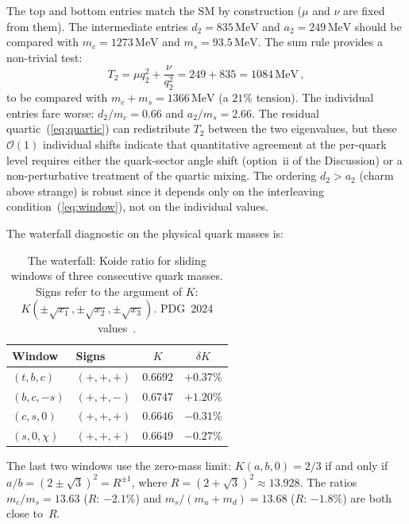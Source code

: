 \documentclass[preprint,12pt]{elsarticle}
\newcommand{\MeV}{\,\mathrm{MeV}}
\begin{document}
The top and bottom entries match the SM by construction
($\mu$ and $\nu$ are fixed from them).
The intermediate entries $d_2 = 835\MeV$ and $a_2 = 249\MeV$
should be compared with $m_c = 1273\MeV$ and $m_s = 93.5\MeV$.
The sum rule provides a non-trivial test:
\begin{equation}
  T_2 = \mu q_2^2 + \frac{\nu}{q_2^2}
  = 249 + 835 = 1084\MeV\,,
  \label{eq:sum_rule}
\end{equation}
to be compared with $m_c + m_s = 1366\MeV$ (a $21\%$ tension).
The individual entries fare worse:
$d_2/m_c = 0.66$ and $a_2/m_s = 2.66$.
The residual quartic~(\ref{eq:quartic}) can redistribute
$T_2$ between the two eigenvalues, but these $\mathcal{O}(1)$
individual shifts indicate that quantitative agreement
at the per-quark level requires either
the quark-sector angle shift (option~ii of the Discussion)
or a non-perturbative treatment of the quartic mixing.
The ordering $d_2 > a_2$ (charm above strange) is robust
since it depends only on the interleaving
condition~(\ref{eq:window}), not on the individual values.

The waterfall diagnostic on the physical quark masses is:

\begin{table}[h]
\centering
\caption{The waterfall: Koide ratio for sliding windows
  of three consecutive quark masses.  Signs refer to the
  argument of $K$:
  $K(\pm\sqrt{x_1}, \pm\sqrt{x_2}, \pm\sqrt{x_3})$.
  PDG~2024 values~\cite{PDG:2024}.}
\label{tab:waterfall}
{\small
\begin{tabular}{llcc}
  \toprule
  Window & Signs & $K$ & $\delta K$ \\
  \midrule
  $(t, b, c)$ & $(+,+,+)$ & $0.6692$ & $+0.37\%$ \\
  $(b, c, -s)$ & $(+,+,-)$ & $0.6747$ & $+1.20\%$ \\
  $(c, s, 0)$ & $(+,+,+)$ & $0.6646$ & $-0.31\%$ \\
  $(s, 0, \chi)$ & $(+,+,+)$ & $0.6649$ & $-0.27\%$ \\
  \bottomrule
\end{tabular}}
\end{table}

\noindent The last two windows use the zero-mass limit:
$K(a, b, 0) = 2/3$ if and only if
$a/b = (2 \pm \sqrt{3})^2 = R^{\pm 1}$,
where $R = (2+\sqrt{3})^2 \approx 13.928$.
The ratios $m_c/m_s = 13.63$ ($R$: $-2.1\%$) and
$m_s/(m_u{+}m_d) = 13.68$ ($R$: $-1.8\%$) are both
close to~$R$.

\end{document}
